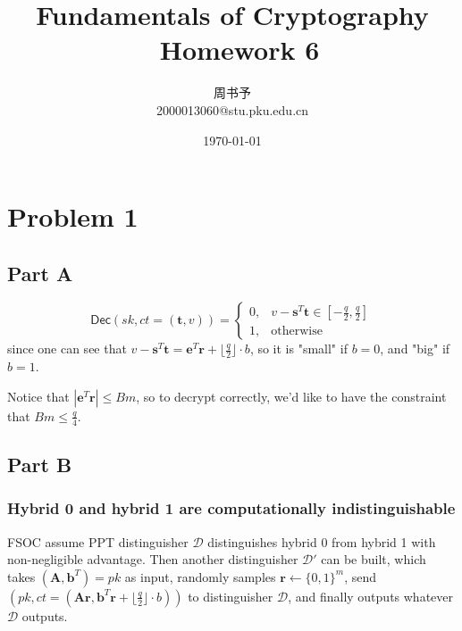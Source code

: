 \documentclass[8pt]{article}
\title{\heiti\zihao{1} Fundamentals  of Cryptography \ Homework 6}
\author{\kaishu\zihao{-3} 周书予\\2000013060@stu.pku.edu.cn}
\date{\today}
\theoremstyle{compact}
\def\le{\leqslant}
\def\Pr#1{\text{Pr}\left[{#1}\right]}
\def\Enc{\textsf{Enc}}
\def\Dec{\textsf{Dec}}
\def\Gen{\textsf{Gen}}
\begin{document}
\large
{}
\pagestyle{plain}



\maketitle

\def\Gen{\textsf{Gen}}
\def\Enc{\textsf{Enc}}
\def\Dec{\textsf{Dec}}
\def\Pr{\text{Pr}}
\def\poly{\text{poly}}
\def\negl{\text{negl}}

\section*{Problem 1}
\subsection*{Part A}
$$\Dec(sk, ct = (\mathbf t, v)) = \begin{cases}
	0, & v - \mathbf{s}^T\mathbf{t} \in [-\frac q2, \frac q2] \\
	1, & \text{otherwise}
\end{cases}$$
since one can see that $v - \mathbf{s}^T\mathbf{t} = \mathbf{e}^T\mathbf{r} + \lfloor\frac q2\rfloor \cdot b$, so it is "small" if $b = 0$, and "big" if $b = 1$.

Notice that $|\mathbf{e}^T\mathbf{r}| \le Bm$, so to decrypt correctly, we'd like to have the constraint that $Bm \le \frac q4$.
\subsection*{Part B}
\subsubsection*{Hybrid 0 and hybrid 1 are computationally indistinguishable}

FSOC assume PPT distinguisher $\mathcal D$ distinguishes hybrid 0 from hybrid 1 with non-negligible advantage. Then another distinguisher $\mathcal D'$ can be built, which takes $(\mathbf A, \mathbf b^T) = pk$ as input, randomly samples $\mathbf r \gets \{0, 1\}^m$, send $(pk, ct = (\mathbf{Ar}, \mathbf b^T\mathbf r + \lfloor\frac q2\rfloor \cdot b))$ to distinguisher $\mathcal D$, and finally outputs whatever $\mathcal D$ outputs.	
\end{document}
